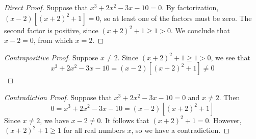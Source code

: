 \begin{proof}[Direct Proof]
	Suppose that $x^3+2x^2-3x-10=0$. By factorization, $(x-2)[(x+2)^2+1]=0$, so at least one of the factors must be zero. The second factor is positive, since $(x+2)^2+1\ge 1>0$. We conclude that $x-2=0$, from which $x=2$.
\end{proof}

\begin{proof}[Contrapositive Proof]
Suppose $x\neq 2$. Since $(x+2)^2+1\ge 1>0$, we see that
	\[
		x^3+2x^2-3x-10=(x-2)[(x+2)^2+1]\neq 0 \tag*{\qedhere}
	\]
\end{proof}

\begin{proof}[Contradiction Proof]
	Suppose that $x^3+2x^2-3x-10=0$ and $x\neq 2$. Then
	\[
		0=x^3+2x^2-3x-10=(x-2)[(x+2)^2+1]
	\]
	Since $x\neq 2$, we have $x-2\neq 0$. It follows that $(x+2)^2+1=0$. However, $(x+2)^2+1\ge 1$ for all real numbers $x$, so we have a contradiction.
\end{proof}


